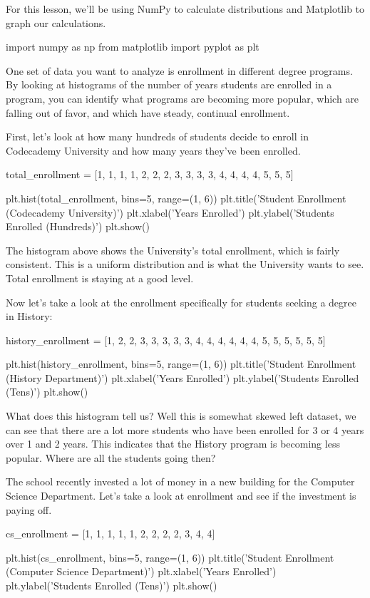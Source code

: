 \documentclass{journal}
\begin{document}
For this lesson, we'll be using NumPy to calculate distributions and Matplotlib to graph our calculations.

import numpy as np
from matplotlib import pyplot as plt

One set of data you want to analyze is enrollment in different degree programs. By looking at histograms of the number of years students are enrolled in a program, you can identify what programs are becoming more popular, which are falling out of favor, and which have steady, continual enrollment.

First, let's look at how many hundreds of students decide to enroll in Codecademy University and how many years they've been enrolled.

total_enrollment = [1, 1, 1, 1, 2, 2, 2, 3, 3, 3, 3, 4, 4, 4, 4, 5, 5, 5]

plt.hist(total_enrollment, bins=5, range=(1, 6))
plt.title('Student Enrollment (Codecademy University)')
plt.xlabel('Years Enrolled')
plt.ylabel('Students Enrolled (Hundreds)')
plt.show()

The histogram above shows the University's total enrollment, which is fairly consistent. This is a uniform distribution and is what the University wants to see. Total enrollment is staying at a good level.

Now let's take a look at the enrollment specifically for students seeking a degree in History:

history_enrollment = [1, 2, 2, 3, 3, 3, 3, 3, 4, 4, 4, 4, 4, 4, 5, 5, 5, 5, 5, 5]

plt.hist(history_enrollment, bins=5, range=(1, 6))
plt.title('Student Enrollment (History Department)')
plt.xlabel('Years Enrolled')
plt.ylabel('Students Enrolled (Tens)')
plt.show()

What does this histogram tell us? Well this is somewhat skewed left dataset, we can see that there are a lot more students who have been enrolled for 3 or 4 years over 1 and 2 years. This indicates that the History program is becoming less popular. Where are all the students going then?

The school recently invested a lot of money in a new building for the Computer Science Department. Let's take a look at enrollment and see if the investment is paying off.

cs_enrollment = [1, 1, 1, 1, 1, 2, 2, 2, 2, 3, 4, 4]

plt.hist(cs_enrollment, bins=5, range=(1, 6))
plt.title('Student Enrollment (Computer Science Department)')
plt.xlabel('Years Enrolled')
plt.ylabel('Students Enrolled (Tens)')
plt.show()
\end{document}
